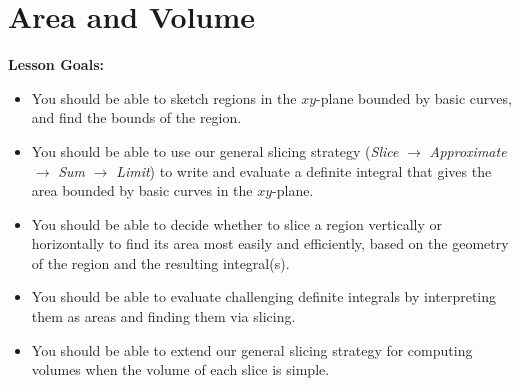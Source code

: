 \documentclass[main]{subfiles}
\begin{document}
\ifSubfilesClassLoaded{%
  \chaptermark{\chapterone}
}{}

\section{Area and Volume} \label{ws1-3}


\begin{framed}
\textbf{Lesson Goals:}
\begin{itemize}
\item You should be able to sketch regions in the $xy$-plane bounded by basic curves, and find the bounds of the region.
\item You should be able to use our general slicing strategy (\textit{Slice} $\rightarrow$ \textit{Approximate} $\rightarrow$ \textit{Sum} $\rightarrow$ \textit{Limit}) to write and evaluate a definite integral that gives the area bounded by basic curves in the $xy$-plane.
\item You should be able to decide whether to slice a region vertically or horizontally to find its area most easily and efficiently, based on the geometry of the region and the resulting integral(s).
\item You should be able to evaluate challenging definite integrals by interpreting them as areas and finding them via slicing.
\item You should be able to extend our general slicing strategy for computing volumes when the volume of each slice is simple.
\end{itemize}
\end{framed}
\end{document}
